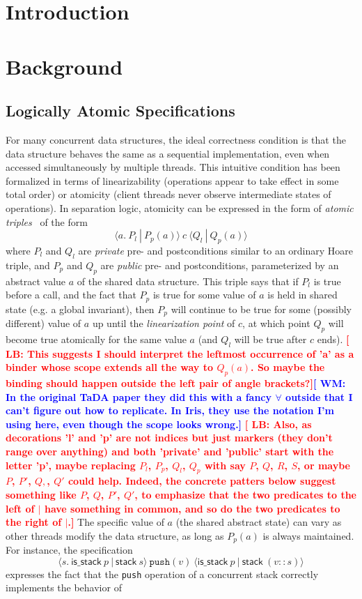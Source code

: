 \documentclass[runningheads]{llncs}
\newcommand{\wm}[1]{\textbf{\textcolor{blue}{[ WM: #1]}}}
\newcommand{\LB}[1]{\textbf{\textcolor{red}{[ LB: #1]}}}
\begin{document}
\section{Introduction}


\section{Background}
\label{background}

\subsection{Logically Atomic Specifications}
\label{atomic}

For many concurrent data structures, the ideal correctness condition is that the data structure behaves the same as a sequential implementation, even when accessed simultaneously by multiple threads. This intuitive condition has been formalized in terms of linearizability (operations appear to take effect in some total order) or atomicity (client threads never observe intermediate states of operations). In separation logic, atomicity can be expressed in the form of \emph{atomic triples}~\cite{tada} of the form $$\langle a.\ P_l\ |\ P_p(a)\rangle\ c\ \langle Q_l\ |\ Q_p(a)\rangle$$ where $P_l$ and $Q_l$ are \emph{private} pre- and postconditions similar to an ordinary Hoare triple, and $P_p$ and $Q_p$ are \emph{public} pre- and postconditions, parameterized by an abstract value $a$ of the shared data structure. This triple says that if $P_l$ is true before a call, and the fact that $P_p$ is true for some value of $a$ is held in shared state (e.g. a global invariant), then $P_p$ will continue to be true for some (possibly different) value of $a$ up until the \emph{linearization point} of $c$, at which point $Q_p$ will become true atomically for the same value $a$ (and $Q_l$ will be true after $c$ ends). \LB{This suggests I should interpret the leftmost occurrence of 'a' as a binder whose scope extends all the way to $Q_p(a)$. So maybe the binding should happen outside the left pair of angle brackets?}\wm{In the original TaDA paper they did this with a fancy $\forall$ outside that I can't figure out how to replicate. In Iris, they use the notation I'm using here, even though the scope looks wrong.} \LB{Also, as decorations 'l' and 'p' are not indices but just markers (they don't range over anything) and both 'private' and 'public' start with the letter 'p', maybe replacing $P_l$, $P_p$, $Q_l$, $Q_p$ with say $P$, $Q$, $R$, $S$, or maybe $P$, $P'$, $Q,$, $Q'$ could help. Indeed, the concrete patters below suggest something like $P$, $Q$, $P'$, $Q'$, to emphasize that the two predicates to the left of $\mid$ have something in common, and so do the two predicates to the right of $\mid$.} The specific value of $a$ (the shared abstract state) can vary as other threads modify the data structure, as long as $P_p(a)$ is always maintained. For instance, the specification $$\langle s.\ \mathsf{is\_stack}\ p\ |\ \mathsf{stack}\ s\rangle\ \texttt{push}(v)\ \langle \mathsf{is\_stack}\ p\ |\ \mathsf{stack}\ (v :: s)\rangle$$ expresses the fact that the \texttt{push} operation of a concurrent stack correctly implements the behavior of 
\end{document}
